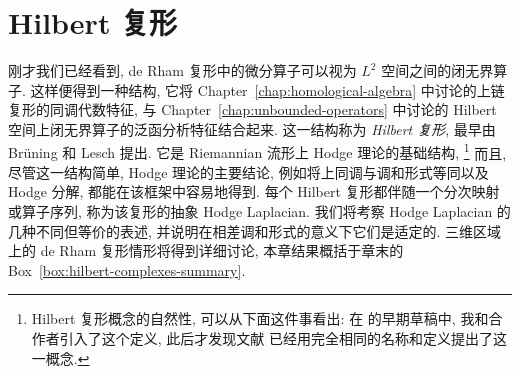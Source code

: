 \clearpage\setcounter{section}{3}
\section{{Hilbert 复形}}\label{chap:hilbert-complexes}

{刚才我们已经看到, de Rham 复形中的微分算子可以视为 $L^2$ 空间之间的闭无界算子. 这样便得到一种结构, 它将 Chapter~\ref{chap:homological-algebra} 中讨论的上链复形的同调代数特征, 与 Chapter~\ref{chap:unbounded-operators} 中讨论的 Hilbert 空间上闭无界算子的泛函分析特征结合起来. 这一结构称为 \emph{Hilbert 复形}, 最早由 Brüning 和 Lesch  提出. 它是 Riemannian 流形上 Hodge 理论的基础结构,}%
\footnote{{Hilbert 复形概念的自然性, 可以从下面这件事看出: 在  的早期草稿中, 我和合作者引入了这个定义, 此后才发现文献  已经用完全相同的名称和定义提出了这一概念.}}%
{而且, 尽管这一结构简单, Hodge 理论的主要结论, 例如将上同调与调和形式等同以及 Hodge 分解, 都能在该框架中容易地得到. 每个 Hilbert 复形都伴随一个分次映射或算子序列, 称为该复形的抽象 Hodge Laplacian. 我们将考察 Hodge Laplacian 的几种不同但等价的表述, 并说明在相差调和形式的意义下它们是适定的. 三维区域上的 de Rham 复形情形将得到详细讨论, 本章结果概括于章末的 Box~\ref{box:hilbert-complexes-summary}.}
